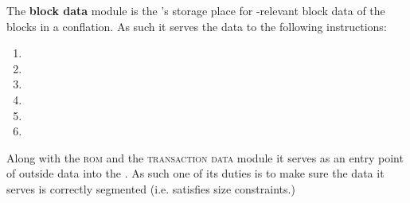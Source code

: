 The \textbf{block data} module \btcMod{} is the \zkEvm{}'s storage place for \evm{}-relevant block data of the blocks in a conflation.
As such it serves the \hubMod{} data to the following instructions:
\begin{multicols}{3}
	\begin{enumerate}
		\item {}
		\item {}
		\item {}
		\item {}
		\item {}
		\item {}
	\end{enumerate}
\end{multicols}
Along with the \textsc{rom} and the \textsc{transaction data} module it serves as an entry point of outside data into the \zkEvm{}.
As such one of its duties is to make sure the data it serves is correctly segmented (i.e. satisfies size constraints.)

